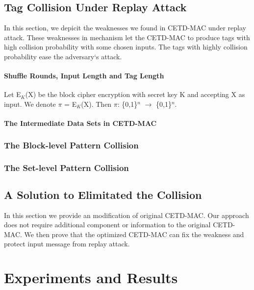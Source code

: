 \documentclass{article}
\begin{document}
 
\subsection{Tag Collision Under Replay Attack}
In this section, we depicit the weaknesses we found in CETD-MAC under replay attack. These weaknesses in mechanism let the CETD-MAC to produce tags with high collision probability with some chosen inputs. The tags with highly collision probability ease the adversary`s attack.
\paragraph{Shuffle Rounds, Input Length and Tag Length}
Let E$_K$(X) be the block cipher encryption with secret key K and accepting X as input. We denote $\pi$ = E$_K$(X). Then $\pi$: \{0,1\}$^n$ $\rightarrow$
\{0,1\}$^n$.
\paragraph{The Intermediate Data Sets in CETD-MAC}
\subsubsection{The Block-level Pattern Collision}
\subsubsection{The Set-level Pattern Collision}

\subsection{A Solution to Elimitated the Collision}
In this section we provide an modification of original CETD-MAC. Our approach does not require additional component or information to the original CETD-MAC. We then prove that the optimized CETD-MAC can fix the weakness and protect input message from replay attack.

\section{Experiments and Results}
\end{document}
